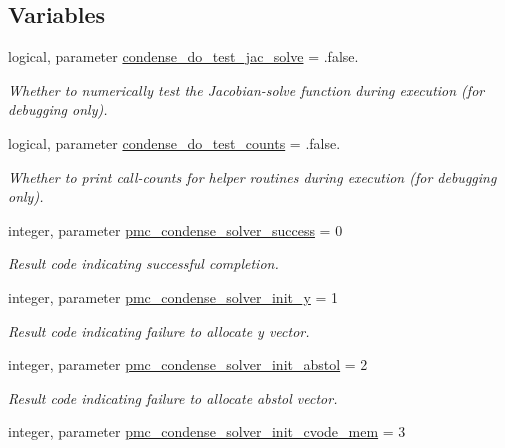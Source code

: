 \subsection*{Variables}
\begin{DoxyCompactItemize}
\item 
logical, parameter \mbox{\hyperlink{namespacepmc__condense_ac7de3176ecbf47a23e0278ff57fed802}{condense\+\_\+do\+\_\+test\+\_\+jac\+\_\+solve}} = .false.
\begin{DoxyCompactList}\small\item\em Whether to numerically test the Jacobian-\/solve function during execution (for debugging only). \end{DoxyCompactList}\item 
logical, parameter \mbox{\hyperlink{namespacepmc__condense_ab969e806479179fa28b147414b3677a1}{condense\+\_\+do\+\_\+test\+\_\+counts}} = .false.
\begin{DoxyCompactList}\small\item\em Whether to print call-\/counts for helper routines during execution (for debugging only). \end{DoxyCompactList}\item 
integer, parameter \mbox{\hyperlink{namespacepmc__condense_ae609c2a0547a2fc09bb22c5e05eaee80}{pmc\+\_\+condense\+\_\+solver\+\_\+success}} = 0
\begin{DoxyCompactList}\small\item\em Result code indicating successful completion. \end{DoxyCompactList}\item 
integer, parameter \mbox{\hyperlink{namespacepmc__condense_a361258031530fbffce78f9296be23482}{pmc\+\_\+condense\+\_\+solver\+\_\+init\+\_\+y}} = 1
\begin{DoxyCompactList}\small\item\em Result code indicating failure to allocate {\ttfamily y} vector. \end{DoxyCompactList}\item 
integer, parameter \mbox{\hyperlink{namespacepmc__condense_a27e346e39aa2e4388fb4cdb05009d947}{pmc\+\_\+condense\+\_\+solver\+\_\+init\+\_\+abstol}} = 2
\begin{DoxyCompactList}\small\item\em Result code indicating failure to allocate {\ttfamily abstol} vector. \end{DoxyCompactList}\item 
integer, parameter \mbox{\hyperlink{namespacepmc__condense_aced2822f651922c373256516609512b5}{pmc\+\_\+condense\+\_\+solver\+\_\+init\+\_\+cvode\+\_\+mem}} = 3

\end{DoxyCompactItemize}
